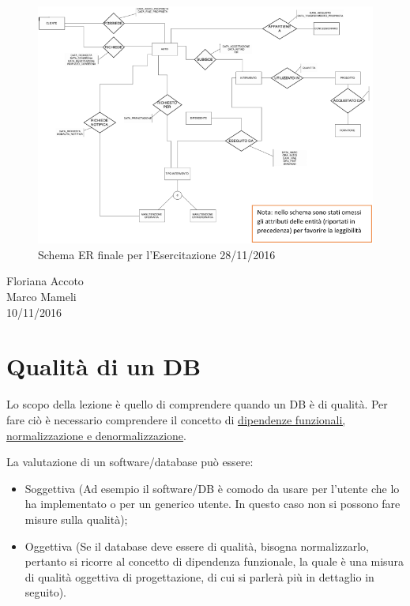 \begin{center}
\begin{figure}[H]
\centering
\includegraphics[scale=0.8]{figures/10112016_finale.png}
\caption{Schema ER finale per l'Esercitazione 28/11/2016}
\end{figure}
\end{center}



\begin{flushright}Floriana Accoto\\Marco Mameli\\10/11/2016\end{flushright}


\section{Qualità di un DB}

Lo scopo della lezione è quello di comprendere quando un DB è di qualità. Per fare ciò è necessario comprendere il concetto di \newline\underline{dipendenze funzionali, normalizzazione e denormalizzazione}.

La valutazione di un software/database può essere:

\begin{itemize}

\item Soggettiva (Ad esempio il software/DB è comodo da usare per l’utente che lo ha implementato o per un generico utente. In questo caso non si possono fare misure sulla qualità);
\item Oggettiva (Se il database deve essere di qualità, bisogna normalizzarlo, pertanto si ricorre al concetto di dipendenza funzionale, la quale è una misura di qualità oggettiva di progettazione, di cui si parlerà più in dettaglio in seguito). 

\end{itemize}

